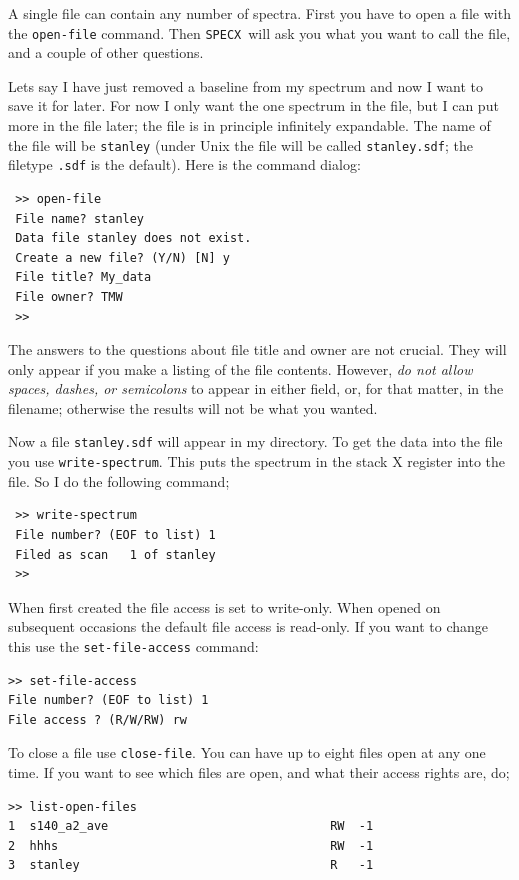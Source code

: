 \documentclass[11pt,twoside]{article}
\newcommand{\SPECX}{{\tt SPECX}}
\begin{document}
A single file can contain any number of spectra.  First you have to
open a file with the {\tt open-file} command.  Then \SPECX\ will ask
you what you want to call the file, and a couple of other questions.

Lets say I have just removed a baseline from my spectrum and now I
want to save it for later.  For now I only want the one spectrum in the
file, but I can put more in the file later; the file is in principle
infinitely expandable. The name of the file will be {\tt stanley}
(under Unix the file will be called {\tt stanley.sdf}; the filetype
{\tt .sdf} is the default). Here is the command dialog:

\begin{verbatim}
 >> open-file
 File name? stanley
 Data file stanley does not exist.
 Create a new file? (Y/N) [N] y
 File title? My_data
 File owner? TMW
 >>
\end{verbatim}

The answers to the questions about file title and owner are not crucial.
They will only appear if you make a listing of the file contents. However,
{\it do not allow spaces, dashes, or semicolons} to appear in either
field, or, for that matter, in the filename; otherwise the results will
not be what you wanted.

Now a file {\tt stanley.sdf} will appear in my directory.  To get the
data into the file you use {\tt write-spectrum}.  This puts the
spectrum in the stack X register into the file.  So I do the following
command;

\begin{verbatim}
 >> write-spectrum
 File number? (EOF to list) 1
 Filed as scan   1 of stanley
 >>
\end{verbatim}

When first created the file access is set to write-only. When opened on
subsequent occasions the default file access is read-only. If you want to
change this use the {\tt set-file-access} command:

\begin{verbatim}
>> set-file-access
File number? (EOF to list) 1
File access ? (R/W/RW) rw
\end{verbatim}

To close a file use {\tt close-file}.  You can have up to eight files open
at any one time.  If you want to see which files are open, and what their
access rights are, do;

\begin{verbatim}
>> list-open-files
1  s140_a2_ave                               RW  -1
2  hhhs                                      RW  -1
3  stanley                                   R   -1
\end{verbatim}
\end{document}
